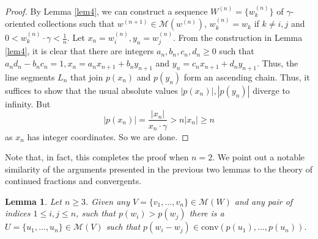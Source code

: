 \documentclass[notitlepage, 10pt]{article}
\theoremstyle{defin}
\theoremstyle{theo}
\newtheorem{lem}{Lemma}[defn]
\theoremstyle{rema}
\newcommand{\cM}{\mathcal{M}}
\newcommand{\cv}{\mathrm{conv}}
\begin{document}
\begin{proof}
    By Lemma \ref{lem4}, we can construct a sequence $W^{(n)} = \{w_k^{(n)}\}$ of $\gamma$-oriented collections such that $w^{(n+1)}\in \cM(w^{(n)})$, $w_k^{(n)} = w_k$ if $k\neq i, j$ and $0<w_k^{(n)}\cdot \gamma <\frac{1}{n}$. Let $x_n=w^{(n)}_i, y_n = w^{(n)}_j$. From the construction in Lemma \ref{lem4}, it is clear that there are integers $a_n, b_n, c_n, d_n\geq 0$ such that $a_nd_n-b_nc_n=1, x_n = a_nx_{n+1}+b_ny_{n+1}$ and $y_n = c_nx_{n+1}+d_ny_{n+1}$. Thus, the line segments $L_n$ that join $p(x_n)$ and $p(y_n)$ form an ascending chain. Thus, it suffices to show that the usual absolute values $|p(x_n)|, |p(y_n)|$ diverge to infinity. But 
    $$|p(x_n)| = \frac{|x_n|}{x_n\cdot \gamma} > n|x_n| \geq n$$ as $x_n$ has integer coordinates. So we are done. 
\end{proof}

Note that, in fact, this completes the proof when $n=2$. We point out a notable similarity of the arguments presented in the previous two lemmas to the theory of continued fractions and convergents. 


\begin{lem}
    \label{lem6}
    Let $n\geq 3$. Given any $V = \{v_1,\ldots,v_n\} \in \cM(W)$ and any pair of indices $1\leq i,j\leq n$, such that $p(w_i)>p(w_j)$ there is a $U=\{u_1,\ldots,u_n\} \in \cM(V)$ such that $p(w_i-w_j) \in \cv(p(u_1),\ldots,p(u_n)).$
\end{lem}
\end{document}
